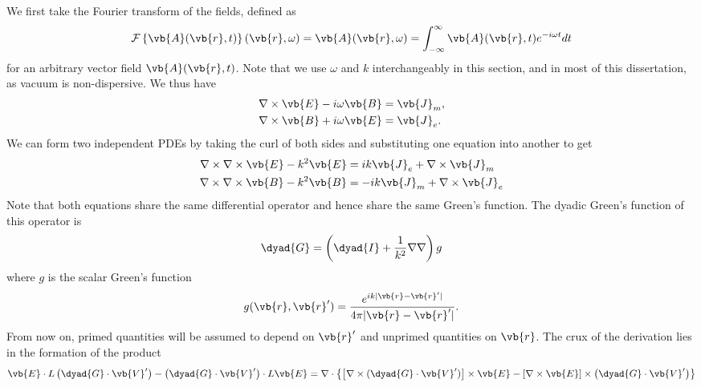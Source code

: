 \documentclass[11pt,SymmetricalJury]{inrsthesis/inrsthesis}
\begin{document}
We first take the Fourier transform of the fields, defined as
  \begin{equation}
    \mathcal{F}\left\{\vb{A}(\vb{r},t)\right\}(\vb{r},\omega)
                      = \vb{A}(\vb{r},\omega)
                      = \int_{-\infty}^\infty \vb{A}(\vb{r},t)e^{-i\omega t }dt
  \end{equation}
for an arbitrary vector field $\vb{A}(\vb{r},t)$.
Note that we use $\omega$ and $k$ interchangeably in this section, and in most of
this dissertation, as vacuum is non-dispersive. We thus have
  \begin{subequations}
  \begin{align}
    \nabla\times\vb{E} - i\omega\vb{B} &= \vb{J}_m, \\
    \nabla\times\vb{B} + i\omega\vb{E} &= \vb{J}_e.
  \end{align}
  \end{subequations}
We can form two independent PDEs by taking the curl of both sides
and substituting one equation into another to get
  \begin{subequations}
  \label{eq:sc.inhomogeneous-wave-equations}
  \begin{align}
    \nabla\times\nabla\times\vb{E} - k^2\vb{E} &= ik\vb{J}_e + \nabla\times\vb{J}_m \\
    \nabla\times\nabla\times\vb{B} - k^2\vb{B} &=-ik\vb{J}_m + \nabla\times\vb{J}_e
  \end{align}
  \end{subequations}
Note that both equations share the same differential operator and hence share the
same Green's function. The dyadic Green's function of this operator is
  \begin{equation}
    \dyad{G} = \left(\dyad{I}+\frac{1}{k^2}\nabla\nabla\right)g
  \end{equation}
where $g$ is the scalar Green's function
  \begin{equation}
    g(\vb{r},\vb{r}') = \frac{e^{ik|\vb{r}-\vb{r}'|}}{4\pi|\vb{r}-\vb{r}'|}.
  \end{equation}
From now on, primed quantities will be assumed to depend on $\vb{r}'$ and
unprimed quantities on $\vb{r}$. The crux of the derivation lies in the formation of the product
  \begin{equation}
    \vb{E}\cdot L\left(\dyad{G}\cdot\vb{V}'\right) - \left(\dyad{G}\cdot\vb{V}'\right)\cdot L\vb{E}
     = \nabla\cdot\left\{\left[\nabla\times(\dyad{G}\cdot\vb{V}')\right]\times\vb{E}-\left[\nabla\times\vb{E}\right]\times\left(\dyad{G}\cdot\vb{V}'\right)\right\}
  \end{equation}
\end{document}
